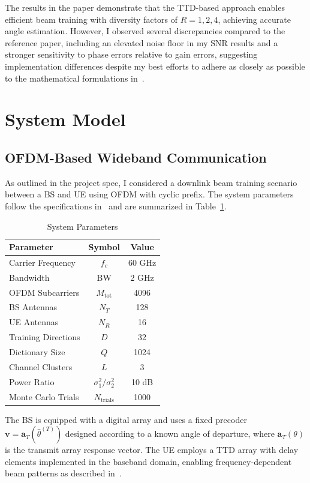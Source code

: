 \documentclass[12pt,letterpaper]{article}
\begin{document}
The results in the paper demonstrate that the TTD-based approach enables efficient beam training with diversity factors of $R = 1, 2, 4$, achieving accurate angle estimation. However, I observed several discrepancies compared to the reference paper, including an elevated noise floor in my SNR results and a stronger sensitivity to phase errors relative to gain errors, suggesting implementation differences despite my best efforts to adhere as closely as possible to the mathematical formulations in~\cite{boljanovic2020design}.

\section{System Model}

\subsection{OFDM-Based Wideband Communication}

As outlined in the project spec, I considered a downlink beam training scenario between a BS and UE using OFDM with cyclic prefix. The system parameters follow the specifications in~\cite{boljanovic2020design} and are summarized in Table~\ref{tab:parameters}.

\begin{table}[h]
\centering
\caption{System Parameters}
\label{tab:parameters}
\begin{tabular}{@{}lcc@{}}
\toprule
\textbf{Parameter} & \textbf{Symbol} & \textbf{Value} \\
\midrule
Carrier Frequency & $f_c$ & 60 GHz \\
Bandwidth & BW & 2 GHz \\
OFDM Subcarriers & $M_{\text{tot}}$ & 4096 \\
BS Antennas & $N_T$ & 128 \\
UE Antennas & $N_R$ & 16 \\
Training Directions & $D$ & 32 \\
Dictionary Size & $Q$ & 1024 \\
Channel Clusters & $L$ & 3 \\
Power Ratio & $\sigma_1^2/\sigma_2^2$ & 10 dB \\
Monte Carlo Trials & $N_{\text{trials}}$ & 1000 \\
\bottomrule
\end{tabular}
\end{table}

\noindent
The BS is equipped with a digital array and uses a fixed precoder $\mathbf{v} = \mathbf{a}_T(\hat{\theta}^{(T)})$ designed according to a known angle of departure, where $\mathbf{a}_T(\theta)$ is the transmit array response vector. The UE employs a TTD array with delay elements implemented in the baseband domain, enabling frequency-dependent beam patterns as described in~\cite{boljanovic2020design}.
\end{document}
